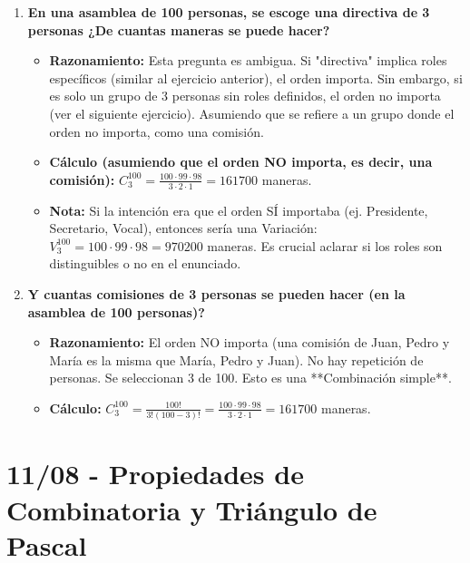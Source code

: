 \documentclass[12pt, letterpaper]{article}
\begin{document}
\begin{enumerate}[leftmargin=*,label=\arabic*.]
	\item \textbf{En una asamblea de 100 personas, se escoge una directiva de 3 personas ¿De cuantas maneras se puede hacer?}
	      \begin{itemize}
		      \item \textbf{Razonamiento:} Esta pregunta es ambigua. Si "directiva" implica roles específicos (similar al ejercicio anterior), el orden importa. Sin embargo, si es solo un grupo de 3 personas sin roles definidos, el orden no importa (ver el siguiente ejercicio). Asumiendo que se refiere a un grupo donde el orden no importa, como una comisión.
		      \item \textbf{Cálculo (asumiendo que el orden NO importa, es decir, una comisión):} $C_3^{100} = \frac{100 \cdot 99 \cdot 98}{3 \cdot 2 \cdot 1} = 161700$ maneras.
		      \item \textbf{Nota:} Si la intención era que el orden SÍ importaba (ej. Presidente, Secretario, Vocal), entonces sería una Variación: $V_3^{100} = 100 \cdot 99 \cdot 98 = 970200$ maneras. Es crucial aclarar si los roles son distinguibles o no en el enunciado.
	      \end{itemize}

	\item \textbf{Y cuantas comisiones de 3 personas se pueden hacer (en la asamblea de 100 personas)?}
	      \begin{itemize}
		      \item \textbf{Razonamiento:} El orden NO importa (una comisión de Juan, Pedro y María es la misma que María, Pedro y Juan). No hay repetición de personas. Se seleccionan 3 de 100. Esto es una **Combinación simple**.
		      \item \textbf{Cálculo:} $C_3^{100} = \frac{100!}{3!(100-3)!} = \frac{100 \cdot 99 \cdot 98}{3 \cdot 2 \cdot 1} = 161700$ maneras.
	      \end{itemize}
\end{enumerate}
\newpage

\section{11/08 - Propiedades de Combinatoria y Triángulo de Pascal}
\end{document}
